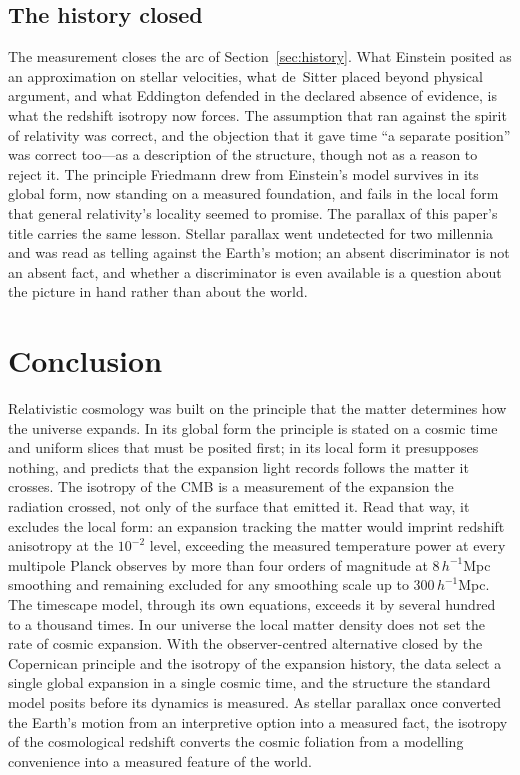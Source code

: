 \documentclass[twocolumn]{aastex701}
\begin{document}
\subsection{The history closed}

The measurement closes the arc of Section~\ref{sec:history}. What Einstein posited as an approximation on stellar velocities, what de~Sitter placed beyond physical argument, and what Eddington defended in the declared absence of evidence, is what the redshift isotropy now forces. The assumption that ran against the spirit of relativity was correct, and the objection that it gave time ``a separate position'' was correct too---as a description of the structure, though not as a reason to reject it. The principle Friedmann drew from Einstein's model survives in its global form, now standing on a measured foundation, and fails in the local form that general relativity's locality seemed to promise. The parallax of this paper's title carries the same lesson. Stellar parallax went undetected for two millennia and was read as telling against the Earth's motion; an absent discriminator is not an absent fact, and whether a discriminator is even available is a question about the picture in hand rather than about the world.

\section{Conclusion}\label{sec:conclusion}

Relativistic cosmology was built on the principle that the matter determines how the universe expands. In its global form the principle is stated on a cosmic time and uniform slices that must be posited first; in its local form it presupposes nothing, and predicts that the expansion light records follows the matter it crosses. The isotropy of the CMB is a measurement of the expansion the radiation crossed, not only of the surface that emitted it. Read that way, it excludes the local form: an expansion tracking the matter would imprint redshift anisotropy at the $10^{-2}$ level, exceeding the measured temperature power at every multipole Planck observes by more than four orders of magnitude at $8\,h^{-1}$Mpc smoothing and remaining excluded for any smoothing scale up to $300\,h^{-1}$Mpc. The timescape model, through its own equations, exceeds it by several hundred to a thousand times. In our universe the local matter density does not set the rate of cosmic expansion. With the observer-centred alternative closed by the Copernican principle and the isotropy of the expansion history, the data select a single global expansion in a single cosmic time, and the structure the standard model posits before its dynamics is measured. As stellar parallax once converted the Earth's motion from an interpretive option into a measured fact, the isotropy of the cosmological redshift converts the cosmic foliation from a modelling convenience into a measured feature of the world.
\end{document}
